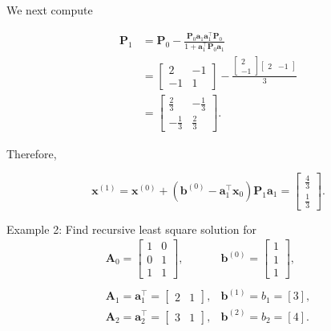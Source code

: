 We next compute

\[
	\begin{aligned}
		\boldsymbol{P}_{1} & =\boldsymbol{P}_{0}-\frac{\boldsymbol{P}_{0} \boldsymbol{a}_{1} \boldsymbol{a}_{1}^{\top} \boldsymbol{P}_{0}}{1+\boldsymbol{a}_{1}^{\top} \boldsymbol{P}_{0} \boldsymbol{a}_{1} } \\
		& =\left[\begin{array}{cc}
			2 & -1 \\
			-1 & 1
		\end{array}\right]-\frac{\left[\begin{array}{c}
				2 \\
				-1
			\end{array}\right]\left[\begin{array}{ll}
				2 & -1
			\end{array}\right]}{3} \\
		& =\left[\begin{array}{cc}
			\frac{2}{3} & -\frac{1}{3} \\
			-\frac{1}{3} & \frac{2}{3}
		\end{array}\right] .
	\end{aligned}
\]

Therefore,

\[
	\boldsymbol{x}^{(1)}=\boldsymbol{x}^{(0)}+\left(\boldsymbol{b}^{(0)}-\boldsymbol{a}_{1}^{\top} \boldsymbol{x}_{0}\right) \boldsymbol{P}_{1} \boldsymbol{a}_{1}=\left[\begin{array}{c}
		\frac{4}{3} \\
		\frac{1}{3}
	\end{array}\right] .
\]

Example 2: Find recursive least square solution for
\[
\begin{array}{rl}
	\boldsymbol{A}_0=\left[\begin{array}{ll}
		1 & 0 \\
		0 & 1 \\
		1 & 1
	\end{array}\right], 
	& \boldsymbol{b}^{(0)}=\left[\begin{array}{l}
		1 \\
		1 \\
		1
	\end{array}\right], \\
	& \\
	\boldsymbol{A}_1  =\boldsymbol{a}_1^{\top}=\left[\begin{array}{ll}
		2 & 1
	\end{array}\right], 
	& \boldsymbol{b}^{(1)}  =b_1=[3], \\
	\boldsymbol{A}_2  =\boldsymbol{a}_2^{\top}=\left[\begin{array}{ll}
		3 & 1
	\end{array}\right], 
	& \boldsymbol{b}^{(2)}  =b_2=[4] .
\end{array}
\]

